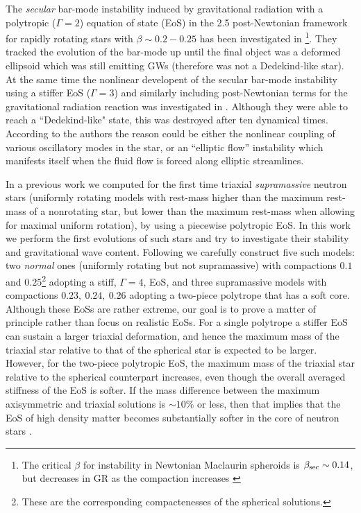 \documentclass[twocolumn,superscriptaddress,showpacs,prd,aps,amsmath,amssymb,nofootinbib]{revtex4-1}
\newcommand{\GB}{\beta}
\begin{document}
The \textit{secular} bar-mode
instability induced by gravitational radiation with a polytropic
($\Gamma=2$) equation of state (EoS) in the 2.5 post-Newtonian
framework for rapidly rotating stars with $\GB\sim0.2-0.25$ has been
investigated in \cite{SK04}\footnote{The critical $\GB$ for instability in
Newtonian Maclaurin spheroids is $\GB_{\rm sec}\sim 0.14$, but
decreases in GR as the compaction increases \cite{SF98}}.  They 
tracked the evolution of the bar-mode
up until the final object was a deformed ellipsoid which was still
emitting GWs (therefore was not a Dedekind-like star). At the same
time the nonlinear developent of the secular bar-mode instability
using a stiffer EoS ($\Gamma=3$) and similarly including
post-Newtonian terms for the gravitational radiation reaction was
investigated in \cite{OTL04}. Although they were able to reach a
``Dedekind-like" state, this was destroyed after ten dynamical
times. According to the authors the reason could be either the
nonlinear coupling of various oscillatory modes in the star, or an
``elliptic flow'' instability which manifests itself when the fluid
flow is forced along elliptic streamlines.

In a previous work \cite{UTea2016} we computed for the first time
triaxial \textit{supramassive} neutron stars (uniformly rotating
models with rest-mass higher than the maximum rest-mass of a
nonrotating star, but lower than the maximum rest-mass when
allowing for maximal uniform rotation), by using a piecewise
polytropic EoS. In this work we perform the first evolutions of such
stars and try to investigate their stability and gravitational wave
content. Following \cite{UTea2016} we carefully construct five such
models: two \textit{normal} ones (uniformly rotating but not
supramassive) with compactions $0.1$ and $0.25$\footnote{These are the
  corresponding compactenesses of the spherical solutions.} adopting a
stiff, $\Gamma=4$, EoS, and three supramassive models with compactions
$0.23,\ 0.24,\ 0.26$ adopting a two-piece polytrope that has a soft
core. Although these EoSs are rather extreme, our goal is to prove a
matter of principle rather than focus on realistic EoSs.  For a single
polytrope a stiffer EoS can sustain a larger triaxial deformation, and 
hence the maximum mass of the triaxial star relative to that of the 
spherical star is expected to be larger. 
However, for the two-piece polytropic EoS, the maximum mass of the
triaxial star relative to the spherical counterpart
increases, even though the overall averaged stiffness of the EoS is 
softer.  If the mass difference between the maximum axisymmetric and
triaxial solutions is $\sim 10\%$ or less, then that implies that the
EoS of high density matter becomes substantially softer in the core of
neutron stars \cite{UTea2016}. 
\end{document}
